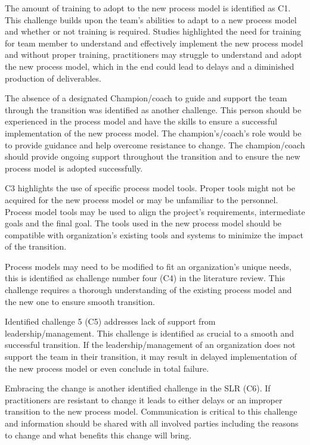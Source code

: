 \documentclass[conference]{IEEEtran}
\begin{document}
The amount of training to adopt to the new process model is identified as C1. This challenge builds upon the team's abilities to adapt to a new process model and whether or not training is required. Studies highlighted the need for training for team member to understand and effectively implement the new process model and without proper training, practitioners may struggle to understand and adopt the new process model, which in the end could lead to delays and a diminished production of deliverables. 

The absence of a designated Champion/coach to guide and support the team through the transition was identified as another challenge. This person should be experienced in the process model and have the skills to ensure a successful implementation of the new process model. The champion's/coach's role would be to provide guidance and help overcome resistance to change. The champion/coach should provide ongoing support throughout the transition and to ensure the new process model is adopted successfully. 

C3 highlights the use of specific process model tools. Proper tools might not be acquired for the new process model or may be unfamiliar to the personnel. Process model tools may be used to align the project's requirements, intermediate goals and the final goal. The tools used in the new process model should be compatible with organization's existing tools and systems to minimize the impact of the transition.

Process models may need to be modified to fit an organization's unique needs, this is identified as challenge number four (C4) in the literature review. This challenge requires a thorough understanding of the existing process model and the new one to ensure smooth transition. 

Identified challenge 5 (C5) addresses lack of support from leadership/management. This challenge is identified as crucial to a smooth and successful transition. If the leadership/management of an organization does not support the team in their transition, it may result in delayed implementation of the new process model or even conclude in total failure. 

Embracing the change is another identified challenge in the SLR (C6). If practitioners are resistant to change it leads to either delays or an improper transition to the new process model. Communication is critical to this challenge and information should be shared with all involved parties including the reasons to change and what benefits this change will bring.  
\end{document}

